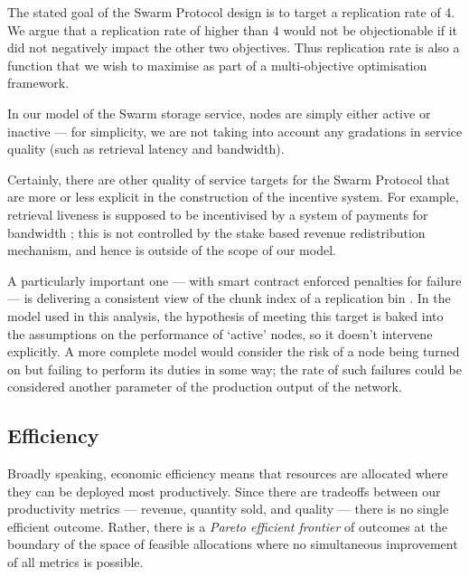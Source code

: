 The stated goal of the Swarm Protocol design is to target a replication rate of 4.
%
We argue that a replication rate of higher than 4 would not be objectionable if it did not negatively impact the other two objectives.
%
Thus replication rate is also a function that we wish to maximise as part of a multi-objective optimisation framework.

In our model of the Swarm storage service, nodes are simply either active or inactive --- for simplicity, we are not taking into account any gradations in service quality (such as retrieval latency and bandwidth).

\begin{remark}

  Certainly, there are other quality of service targets for the Swarm Protocol that are more or less explicit in the construction of the incentive system.
  For example, retrieval liveness is supposed to be incentivised by a system of payments for bandwidth \cite[\S3.2]{book-of-swarm}; this is not controlled by the stake based revenue redistribution mechanism, and hence is outside of the scope of our model.
  
  A particularly important one --- with smart contract enforced penalties for failure --- is delivering a consistent view of the chunk index of a replication bin \cite[\S3.4.4]{book-of-swarm}.
  In the model used in this analysis, the hypothesis of meeting this target is baked into the assumptions on the performance of `active' nodes, so it doesn't intervene explicitly.
  A more complete model would consider the risk of a node being turned on but failing to perform its duties in some way; the rate of such failures could be considered another parameter of the production output of the network.

\end{remark}

\subsection{Efficiency}
\label{section:efficiency}

Broadly speaking, economic efficiency means that resources are allocated where they can be deployed most productively.
%
Since there are tradeoffs between our productivity metrics --- revenue, quantity sold, and quality --- there is no single efficient outcome.
%
Rather, there is a \emph{Pareto efficient frontier} of outcomes at the boundary of the space of feasible allocations where no simultaneous improvement of all metrics is possible.

